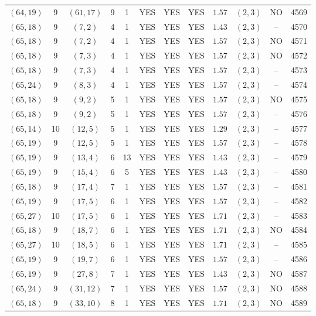 \begin{longtable}{|c|c|c|c|c|c|c|c|c|c|c|c|}
$(64,19)$ & 9 & $(61,17)$ & 9 & 1 & YES & YES & YES & $1.57$ & $(2,3)$ & NO & 4569\\
$(65,18)$ & 9 & $(7,2)$ & 4 & 1 & YES & YES & YES & $1.43$ & $(2,3)$ & -- & 4570\\
$(65,18)$ & 9 & $(7,2)$ & 4 & 1 & YES & YES & YES & $1.57$ & $(2,3)$ & NO & 4571\\
$(65,18)$ & 9 & $(7,3)$ & 4 & 1 & YES & YES & YES & $1.57$ & $(2,3)$ & NO & 4572\\
$(65,18)$ & 9 & $(7,3)$ & 4 & 1 & YES & YES & YES & $1.57$ & $(2,3)$ & -- & 4573\\
$(65,24)$ & 9 & $(8,3)$ & 4 & 1 & YES & YES & YES & $1.57$ & $(2,3)$ & -- & 4574\\
$(65,18)$ & 9 & $(9,2)$ & 5 & 1 & YES & YES & YES & $1.57$ & $(2,3)$ & NO & 4575\\
$(65,18)$ & 9 & $(9,2)$ & 5 & 1 & YES & YES & YES & $1.57$ & $(2,3)$ & -- & 4576\\
$(65,14)$ & 10 & $(12,5)$ & 5 & 1 & YES & YES & YES & $1.29$ & $(2,3)$ & -- & 4577\\
$(65,19)$ & 9 & $(12,5)$ & 5 & 1 & YES & YES & YES & $1.57$ & $(2,3)$ & -- & 4578\\
$(65,19)$ & 9 & $(13,4)$ & 6 & 13 & YES & YES & YES & $1.43$ & $(2,3)$ & -- & 4579\\
$(65,19)$ & 9 & $(15,4)$ & 6 & 5 & YES & YES & YES & $1.43$ & $(2,3)$ & -- & 4580\\
$(65,18)$ & 9 & $(17,4)$ & 7 & 1 & YES & YES & YES & $1.57$ & $(2,3)$ & -- & 4581\\
$(65,19)$ & 9 & $(17,5)$ & 6 & 1 & YES & YES & YES & $1.57$ & $(2,3)$ & -- & 4582\\
$(65,27)$ & 10 & $(17,5)$ & 6 & 1 & YES & YES & YES & $1.71$ & $(2,3)$ & -- & 4583\\
$(65,18)$ & 9 & $(18,7)$ & 6 & 1 & YES & YES & YES & $1.71$ & $(2,3)$ & NO & 4584\\
$(65,27)$ & 10 & $(18,5)$ & 6 & 1 & YES & YES & YES & $1.71$ & $(2,3)$ & -- & 4585\\
$(65,19)$ & 9 & $(19,7)$ & 6 & 1 & YES & YES & YES & $1.57$ & $(2,3)$ & -- & 4586\\
$(65,19)$ & 9 & $(27,8)$ & 7 & 1 & YES & YES & YES & $1.43$ & $(2,3)$ & NO & 4587\\
$(65,24)$ & 9 & $(31,12)$ & 7 & 1 & YES & YES & YES & $1.57$ & $(2,3)$ & NO & 4588\\
$(65,18)$ & 9 & $(33,10)$ & 8 & 1 & YES & YES & YES & $1.71$ & $(2,3)$ & NO & 4589\\

\end{longtable}
